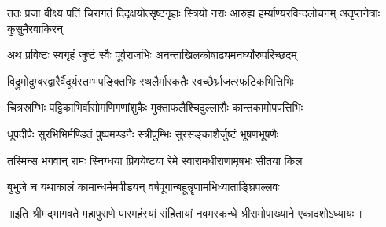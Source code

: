 \fourlineindentedshloka
{ततः प्रजा वीक्ष्य पतिं चिरागतं}
{दिदृक्षयोत्सृष्टगृहाः स्त्रियो नराः}
{आरुह्य हर्म्याण्यरविन्दलोचनम्}
{अतृप्तनेत्राः कुसुमैरवाकिरन्} %

\twolineshloka
{अथ प्रविष्टः स्वगृहं जुष्टं स्वैः पूर्वराजभिः}
{अनन्ताखिलकोषाढ्यमनर्घ्योरुपरिच्छदम्} %

\twolineshloka
{विद्रुमोदुम्बरद्वारैर्वैदूर्यस्तम्भपङ्क्तिभिः}
{स्थलैर्मारकतैः स्वच्छैर्भ्राजत्स्फटिकभित्तिभिः} %

\twolineshloka
{चित्रस्रग्भिः पट्टिकाभिर्वासोमणिगणांशुकैः}
{मुक्ताफलैश्चिदुल्लासैः कान्तकामोपपत्तिभिः} %

\twolineshloka
{धूपदीपैः सुरभिभिर्मण्डितं पुष्पमण्डनैः}
{स्त्रीपुम्भिः सुरसङ्काशैर्जुष्टं भूषणभूषणैः} %

\twolineshloka
{तस्मिन्स भगवान् रामः स्निग्धया प्रिययेष्टया}
{रेमे स्वारामधीराणामृषभः सीतया किल} %

\twolineshloka
{बुभुजे च यथाकालं कामान्धर्ममपीडयन्}
{वर्षपूगान्बहून्नॄणामभिध्याताङ्घ्रिपल्लवः} %


॥इति श्रीमद्भागवते महापुराणे पारमहंस्यां संहितायां नवमस्कन्धे श्रीरामोपाख्याने एकादशोऽध्यायः॥


\closesection